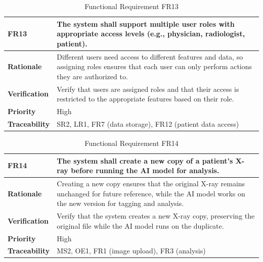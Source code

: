 \documentclass[12pt]{article}
\begin{document}
\begin{table}[h!]
\centering
{}
\begin{tabular}{|p{3.5cm}|p{11.5cm}|}
\hline
\rowcolor{gray!30}
\textbf{FR13} & The system shall support multiple user roles with appropriate access levels (e.g., physician, radiologist, patient). \\
\hline
\textbf{Rationale} & Different users need access to different features and data, so assigning roles ensures that each user can only perform actions they are authorized to. \\
\hline
\textbf{Verification} & Verify that users are assigned roles and that their access is restricted to the appropriate features based on their role. \\
\hline
\textbf{Priority} & High \\
\hline
\textbf{Traceability} &  SR2, LR1, FR7 (data storage), FR12 (patient data access) \\
\hline
\end{tabular}
\caption{Functional Requirement FR13}
\end{table}
\begin{table}[h!]
\centering
{}
\begin{tabular}{|p{3.5cm}|p{11.5cm}|}
\hline
\rowcolor{gray!30}
\textbf{FR14} & The system shall create a new copy of a patient’s X-ray before running the AI model for analysis. \\
\hline
\textbf{Rationale} & Creating a new copy ensures that the original X-ray remains unchanged for future reference, while the AI model works on the new version for tagging and analysis. \\
\hline
\textbf{Verification} & Verify that the system creates a new X-ray copy, preserving the original file while the AI model runs on the duplicate. \\
\hline
\textbf{Priority} & High \\
\hline
\textbf{Traceability} & MS2, OE1, FR1 (image upload), FR3 (analysis) \\
\hline
\end{tabular}
\caption{Functional Requirement FR14}
\end{table}
\end{document}
